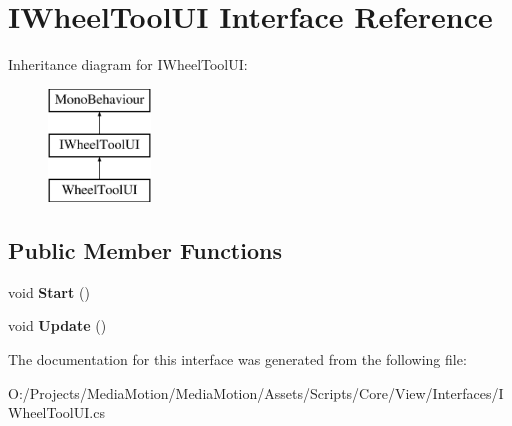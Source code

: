 \hypertarget{interface_i_wheel_tool_u_i}{\section{I\+Wheel\+Tool\+U\+I Interface Reference}
\label{interface_i_wheel_tool_u_i}
}
Inheritance diagram for I\+Wheel\+Tool\+U\+I\+:\begin{figure}[H]
\begin{center}
\leavevmode
\includegraphics[height=3.000000cm]{interface_i_wheel_tool_u_i}
\end{center}
\end{figure}
\subsection*{Public Member Functions}
\begin{DoxyCompactItemize}
\item 
\hypertarget{interface_i_wheel_tool_u_i_a79906de3461b6e8001b5a6524865269c}{void {\bfseries Start} ()}\label{interface_i_wheel_tool_u_i_a79906de3461b6e8001b5a6524865269c}

\item 
\hypertarget{interface_i_wheel_tool_u_i_a9275a64052867ecc6b64f30f04dbccfe}{void {\bfseries Update} ()}\label{interface_i_wheel_tool_u_i_a9275a64052867ecc6b64f30f04dbccfe}

\end{DoxyCompactItemize}


The documentation for this interface was generated from the following file\+:\begin{DoxyCompactItemize}
\item 
O\+:/\+Projects/\+Media\+Motion/\+Media\+Motion/\+Assets/\+Scripts/\+Core/\+View/\+Interfaces/I\+Wheel\+Tool\+U\+I.\+cs\end{DoxyCompactItemize}

